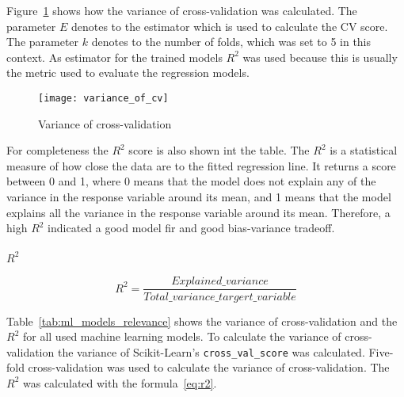 Figure~\ref{fig:variance-of-cv} shows how the variance of cross-validation was calculated.
The parameter $E$ denotes to the estimator which is used to calculate the \ac{CV} score.
The parameter $k$ denotes to the number of folds, which was set to 5 in this context.
As estimator for the trained models $R^2$ was used because this is usually the metric used to
evaluate the regression models.

\begin{figure}[h]
    \begin{tcolorbox}[arc=0pt,boxrule=0.5pt]
        \centering
        \texttt{[image: variance\_of\_cv]}
        \caption{Variance of cross-validation}
        \label{fig:variance-of-cv}
    \end{tcolorbox}
\end{figure}

For completeness the $R^2$ score is also shown int the table.
The $R^2$ is a statistical measure of how close the data are to the fitted regression line.
It returns a score between 0 and 1, where 0 means that the model does not explain any of the
variance in the response variable around its mean, and 1 means that the model explains all the
variance in the response variable around its mean.
Therefore, a high $R^2$ indicated a good model fir and good bias-variance tradeoff.
\cite[p. 43]{muller_introductionmachinelearning_2016}

\paragraph*{$R^2$}

\begin{equation}
    \label{eq:r2}
    R^2 = \frac{Explained\_variance}{Total\_variance\_targert\_variable}
\end{equation}

Table~\ref*{tab:ml_models_relevance} shows the variance of cross-validation and the $R^2$ for all
used machine learning models.
To calculate the variance of cross-validation the variance of Scikit-Learn's
\texttt{cross\_val\_score} was calculated.
Five-fold cross-validation was used to calculate the variance of cross-validation. The $R^2$ was
calculated with the formula~\ref{eq:r2}.

